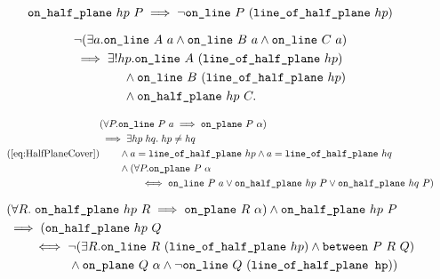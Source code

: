 \begin{equation}\label{eq:halfPlaneNotOnLine}
  \code{on\_half\_plane}\ hp\ P \implies \neg\code{on\_line}\ P\ (\code{line\_of\_half\_plane}\ hp)
\end{equation}

\begin{equation}\label{eq:uniqueHalfPlane}
  \begin{split}
    &\Triangle{a}{A}{B}{C}\\
    &\implies \exists! hp. \code{on\_line}\ A\ (\code{line\_of\_half\_plane}\ hp)\\
    &\qquad\qquad\wedge\code{on\_line}\ B\ (\code{line\_of\_half\_plane}\ hp)\\
    &\qquad\qquad\wedge\code{on\_half\_plane}\ hp\ C.
\end{split}
\end{equation}

\begin{equation}\tag{\ref{eq:HalfPlaneCover}}
  \begin{split}
    &(\forall P. \code{on\_line}\ P\ a \implies \code{on\_plane}\ P\ \alpha)\\
    &\implies \exists hp\; hq.\; hp \neq hq\\
    &\qquad \wedge a = \code{line\_of\_half\_plane}\ hp \wedge a = \code{line\_of\_half\_plane}\ hq\\
    &\qquad \wedge (\forall P. \code{on\_plane}\ P\ \alpha\\
    &\qquad\qquad \iff \code{on\_line}\ P\ a \vee \code{on\_half\_plane}\ hp\ P \vee \code{on\_half\_plane}\ hq\ P)
  \end{split}
\end{equation}

\begin{equation}\label{eq:onHalfPlaneNotBet}
  \begin{split}
    &(\forall R.\; \code{on\_half\_plane}\ hp\ R \implies \code{on\_plane}\ R\ \alpha) \wedge \code{on\_half\_plane}\ hp\ P\\
    &\implies (\code{on\_half\_plane}\ hp\ Q\\
    &\qquad \iff \neg(\exists R. \code{on\_line}\ R\ (\code{line\_of\_half\_plane}\ hp) \wedge \between{P}{R}{Q})\\
    &\qquad\qquad\quad \wedge \code{on\_plane}\ Q\ \alpha \wedge \neg\code{on\_line}\ Q\ (\code{line\_of\_half\_plane hp}))
  \end{split}
\end{equation}

